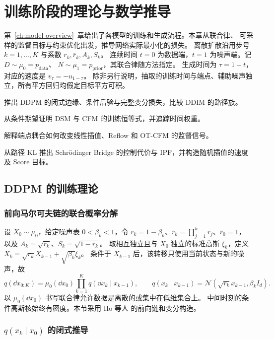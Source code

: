 \chapter{训练阶段的理论与数学推导}
\label{ch:training}

第~\ref{ch:model-overview}~章给出了各模型的训练和生成流程。本章从联合律、
可采样的监督目标与约束优化出发，推导网络实际最小化的损失。
离散扩散沿用步号 \(k=1,\ldots,K\) 与系数 \(r_k,\bar r_k,A_k,S_k\)。
连续时间 \(t=0\) 为数据端，\(t=1\) 为噪声端。记 \(D\sim\mu_0=p_{\mathrm{data}}\)、
\(N\sim\mu_1=p_{\mathrm{prior}}\)，其联合律随方法指定。
生成时间为 \(\tau=1-t\)，对应的速度是 \(v_\tau=-u_{1-\tau}\)。
除非另行说明，抽取的训练时间与端点、辅助噪声独立，所有平方回归均假定目标平方可积。

\begin{learningobjectives}
  \item 推出 DDPM 的闭式边缘、条件后验与完整变分损失，比较 DDIM 的路径族。
  \item 从条件期望证明 DSM 与 CFM 的训练恒等式，并追踪时间权重。
  \item 解释端点耦合如何改变线性插值、Reflow 和 OT-CFM 的监督信号。
  \item 从路径 KL 推出 Schrödinger Bridge 的控制代价与 IPF，并构造随机插值的速度及 Score 目标。
\end{learningobjectives}

\section{DDPM 的训练理论}
\label{sec:training-ddpm}

\subsection{前向马尔可夫链的联合概率分解}

设 \(X_0\sim\mu_0\)，给定噪声表 \(0<\beta_k<1\)，令
\(r_k=1-\beta_k\)、\(\bar r_k=\prod_{j=1}^kr_j\)、\(\bar r_0=1\)，
以及 \(A_k=\sqrt{\bar r_k}\)、\(S_k=\sqrt{1-\bar r_k}\)。
取相互独立且与 \(X_0\) 独立的标准高斯 \(\xi_k\)，定义
\(X_k=\sqrt{r_k}X_{k-1}+\sqrt{\beta_k}\xi_k\)。
条件于 \(X_{k-1}\) 后，该转移只使用当前状态与新的噪声，故
\[
  q(\dd x_{0:K})=\mu_0(\dd x_0)\prod_{k=1}^K q(\dd x_k\mid x_{k-1}),
  \qquad q(x_k\mid x_{k-1})=\mathcal N(\sqrt{r_k}x_{k-1},\beta_k I_d).
\]
以 \(\mu_0(\dd x_0)\) 书写联合律允许数据是离散的或集中在低维集合上。
中间时刻的条件高斯核始终有密度。本节采用 Ho 等人 \cite{ho2020ddpm} 的前向链和变分构造。

\subsection{\texorpdfstring{\(q(x_k\mid x_0)\)}{q(x\_k | x\_0)} 的闭式推导\requiredderivation}
\label{subsec:ddpm-forward-marginal}

